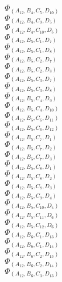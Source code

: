 \documentclass[14pt]{article}
\begin{document}
    $\Phi_{({A}_{12}, {B}_{4}, {C}_{5}, {D}_{10})}$ \\ 
    $\Phi_{({A}_{12}, {B}_{4}, {C}_{9}, {D}_{5})}$ \\ 
    $\Phi_{({A}_{12}, {B}_{4}, {C}_{10}, {D}_{5})}$ \\ 
    $\Phi_{({A}_{12}, {B}_{5}, {C}_{1}, {D}_{7})}$ \\ 
    $\Phi_{({A}_{12}, {B}_{5}, {C}_{1}, {D}_{8})}$ \\ 
    $\Phi_{({A}_{12}, {B}_{5}, {C}_{2}, {D}_{7})}$ \\ 
    $\Phi_{({A}_{12}, {B}_{5}, {C}_{2}, {D}_{8})}$ \\ 
    $\Phi_{({A}_{12}, {B}_{5}, {C}_{3}, {D}_{7})}$ \\ 
    $\Phi_{({A}_{12}, {B}_{5}, {C}_{3}, {D}_{8})}$ \\ 
    $\Phi_{({A}_{12}, {B}_{5}, {C}_{4}, {D}_{9})}$ \\ 
    $\Phi_{({A}_{12}, {B}_{5}, {C}_{4}, {D}_{10})}$ \\ 
    $\Phi_{({A}_{12}, {B}_{5}, {C}_{6}, {D}_{11})}$ \\ 
    $\Phi_{({A}_{12}, {B}_{5}, {C}_{6}, {D}_{12})}$ \\ 
    $\Phi_{({A}_{12}, {B}_{5}, {C}_{7}, {D}_{1})}$ \\ 
    $\Phi_{({A}_{12}, {B}_{5}, {C}_{7}, {D}_{2})}$ \\ 
    $\Phi_{({A}_{12}, {B}_{5}, {C}_{7}, {D}_{3})}$ \\ 
    $\Phi_{({A}_{12}, {B}_{5}, {C}_{8}, {D}_{1})}$ \\ 
    $\Phi_{({A}_{12}, {B}_{5}, {C}_{8}, {D}_{2})}$ \\ 
    $\Phi_{({A}_{12}, {B}_{5}, {C}_{8}, {D}_{3})}$ \\ 
    $\Phi_{({A}_{12}, {B}_{5}, {C}_{9}, {D}_{4})}$ \\ 
    $\Phi_{({A}_{12}, {B}_{5}, {C}_{10}, {D}_{4})}$ \\ 
    $\Phi_{({A}_{12}, {B}_{5}, {C}_{11}, {D}_{6})}$ \\ 
    $\Phi_{({A}_{12}, {B}_{5}, {C}_{12}, {D}_{6})}$ \\ 
    $\Phi_{({A}_{12}, {B}_{6}, {C}_{1}, {D}_{13})}$ \\ 
    $\Phi_{({A}_{12}, {B}_{6}, {C}_{1}, {D}_{14})}$ \\ 
    $\Phi_{({A}_{12}, {B}_{6}, {C}_{2}, {D}_{13})}$ \\ 
    $\Phi_{({A}_{12}, {B}_{6}, {C}_{2}, {D}_{14})}$ \\ 
    $\Phi_{({A}_{12}, {B}_{6}, {C}_{3}, {D}_{13})}$ \\ 
\end{document}
